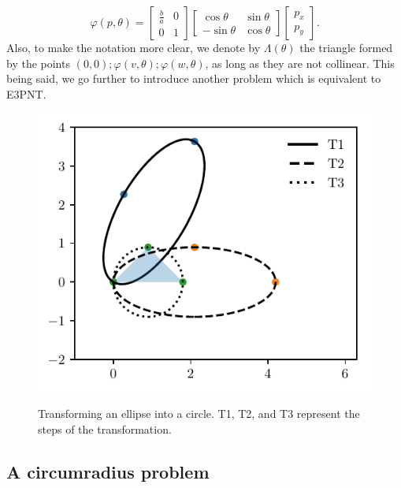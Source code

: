 \begin{equation}\label{eq:trpnts}
\varphi(p, \theta)=\left[\begin{array}{cc}
\frac{b}{a}&0\\
0&1
\end{array}\right]
\left[\begin{array}{cc}
\cos{\theta}&\sin{\theta}\\
-\sin{\theta}&\cos{\theta}
\end{array}\right]\left[\begin{array}{c}
p_x\\
p_y
\end{array}\right].
\end{equation}
Also, to make the notation more clear, we denote by $\Lambda(\theta)$ the triangle formed by the points $(0, 0); \varphi(v, \theta); \varphi(w, \theta)$, as long as they are not collinear. This being said, we go further to introduce another problem which is equivalent to E3PNT.

\begin{figure}
	\centering
	\caption{Transforming an ellipse into a circle. T1, T2, and T3 represent the steps of the transformation.}
	\includegraphics{tex/figures/scripts/circumscribed-circle}
	\fautor
	\label{fig:circumscribed-circle}
\end{figure}

\subsection{A circumradius problem}

